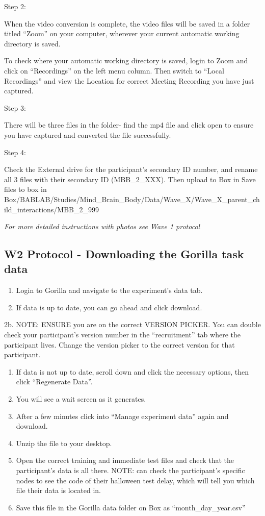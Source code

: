 \documentclass[
]{book}
\begin{document}
Step 2:

When the video conversion is complete, the video files will be saved in a folder titled ``Zoom'' on your computer, wherever your current automatic working directory is saved.

To check where your automatic working directory is saved, login to Zoom and click on ``Recordings'' on the left menu column. Then switch to ``Local Recordings'' and view the Location for correct Meeting Recording you have just captured.

Step 3:

There will be three files in the folder- find the mp4 file and click open to ensure you have captured and converted the file successfully.

Step 4:

Check the External drive for the participant's secondary ID number, and rename all 3 files with their secondary ID (MBB\_2\_XXX). Then upload to Box in Save files to box in Box/BABLAB/Studies/Mind\_Brain\_Body/Data/Wave\_X/Wave\_X\_parent\_child\_interactions/MBB\_2\_999

\emph{For more detailed instructions with photos see Wave 1 protocol}

\hypertarget{w2-protocol---downloading-the-gorilla-task-data}{%
\subsection{W2 Protocol - Downloading the Gorilla task data}\label{w2-protocol---downloading-the-gorilla-task-data}}

\begin{enumerate}
\def\labelenumi{\arabic{enumi}.}
\item
  Login to Gorilla and navigate to the experiment's data tab.
\item
  If data is up to date, you can go ahead and click download.
\end{enumerate}

2b. NOTE: ENSURE you are on the correct VERSION PICKER. You can double check your participant's version number in the ``recruitment'' tab where the participant lives. Change the version picker to the correct version for that participant.

\begin{enumerate}
\def\labelenumi{\arabic{enumi}.}
\setcounter{enumi}{2}
\item
  If data is not up to date, scroll down and click the necessary options, then click ``Regenerate Data''.
\item
  You will see a wait screen as it generates.
\item
  After a few minutes click into ``Manage experiment data'' again and download.
\item
  Unzip the file to your desktop.
\item
  Open the correct training and immediate test files and check that the participant's data is all there. NOTE: can check the participant's specific nodes to see the code of their halloween test delay, which will tell you which file their data is located in.
\item
  Save this file in the Gorilla data folder on Box as ``month\_day\_year.csv''
\end{enumerate}
\end{document}
